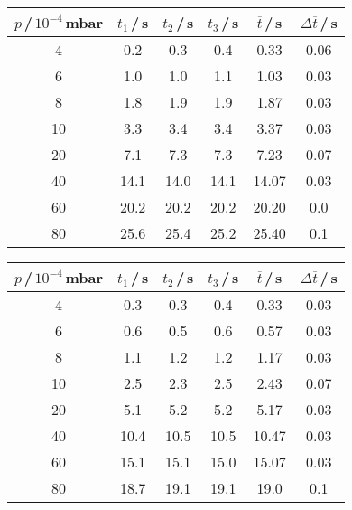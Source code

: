 \begin{table}
  \vspace{1cm}

  \begin{subtable}{0.49\textwidth}
    \hspace{-1.5cm}
    \begin{tabular}{c|c|c|c|c|c}\label{tab:Leck15Turbo}
      $p$\,/\,$10^{-4}$\,mbar & $t_1$\,/\,s & $t_2$\,/\,s & $t_3$\,/\,s & $\overline{t}$\,/\,s & $\Delta\overline{t}$\,/\,s \\
      \midrule
      4  & 0.2  & 0.3  & 0.4  & 0.33  & 0.06 \\
      6  & 1.0  & 1.0  & 1.1  & 1.03  & 0.03 \\
      8  & 1.8  & 1.9  & 1.9  & 1.87  & 0.03 \\
      10 & 3.3  & 3.4  & 3.4  & 3.37  & 0.03 \\
      20 & 7.1  & 7.3  & 7.3  & 7.23  & 0.07 \\
      40 & 14.1 & 14.0 & 14.1 & 14.07 & 0.03 \\
      60 & 20.2 & 20.2 & 20.2 & 20.20 & 0.0  \\
      80 & 25.6 & 25.4 & 25.2 & 25.40 & 0.1  \\
    \end{tabular}
  \end{subtable}\hspace{2cm}
  \begin{subtable}{0.49\textwidth}
    \hspace{-1.4cm}
    \begin{tabular}{c|c|c|c|c|c}\label{tab:Leck20Turbo}
      $p$\,/\,$10^{-4}$\,mbar & $t_1$\,/\,s & $t_2$\,/\,s & $t_3$\,/\,s & $\overline{t}$\,/\,s & $\Delta\overline{t}$\,/\,s \\
      \midrule
      4  & 0.3  & 0.3  & 0.4  & 0.33  & 0.03 \\
      6  & 0.6  & 0.5  & 0.6  & 0.57  & 0.03 \\
      8  & 1.1  & 1.2  & 1.2  & 1.17  & 0.03 \\
      10 & 2.5  & 2.3  & 2.5  & 2.43  & 0.07 \\
      20 & 5.1  & 5.2  & 5.2  & 5.17  & 0.03 \\
      40 & 10.4 & 10.5 & 10.5 & 10.47 & 0.03 \\
      60 & 15.1 & 15.1 & 15.0 & 15.07 & 0.03 \\
      80 & 18.7 & 19.1 & 19.1 & 19.0  & 0.1  \\
    \end{tabular}
  \end{subtable}
\end{table}

